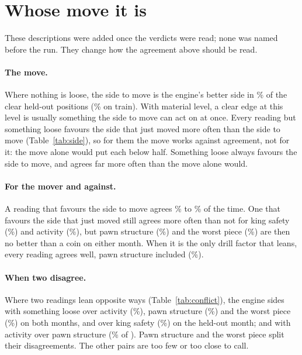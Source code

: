 \documentclass[11pt]{article}
\begin{document}
\section{Whose move it is}

\SideTable

These descriptions were added once the verdicts were read; none was named before the run. They
change how the agreement above should be read.

\paragraph{The move.} Where nothing is loose, the side to move is the engine's better side in
\MoverHeld\% of the \MoverHeldN{} clear held-out positions (\MoverTrain\% on train). With material
level, a clear edge at this level is usually something the side to move can act on at once.
Every reading but something loose favours the side that just moved more often than the side to
move (Table~\ref{tab:side}), so for them the move works against agreement, not for it: the move
alone would put each below half. Something loose always favours the side to move, and agrees far
more often than the move alone would.

\paragraph{For the mover and against.} A reading that favours the side to move agrees
\ForMoverMin\% to \ForMoverMax\% of the time. One that favours the side that just moved still
agrees more often than not for king safety (\KingForOther\%) and activity (\ActivityForOther\%),
but pawn structure (\StructureForOther\%) and the worst piece (\WorstForOther\%) are then no
better than a coin on either month. When it is the only drill factor that leans, every reading
agrees well, pawn structure included (\StructureAlone\%).

\ConflictTable

\paragraph{When two disagree.} Where two readings lean opposite ways (Table~\ref{tab:conflict}),
the engine sides with something loose over activity (\LooseOverActivity\%), pawn structure
(\LooseOverStructure\%) and the worst piece (\LooseOverWorst\%) on both months, and over king
safety (\LooseOverKing\%) on the held-out month; and with activity over pawn structure
(\ActivityOverStructure\% of \ActivityOverStructureN). Pawn structure and the worst piece split
their disagreements. The other pairs are too few or too close to call.
\end{document}
